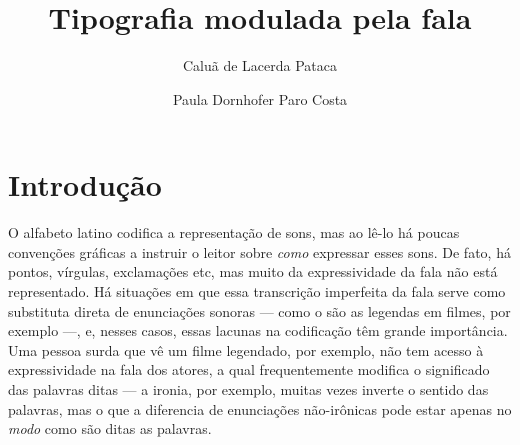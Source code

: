 \documentclass[11pt]{article}
\title{Tipografia modulada pela fala}
\author{Caluã de Lacerda Pataca \and Paula Dornhofer Paro Costa}
\begin{document}
\hyphenation{}
\pagestyle{fancy}


  \section{Introdu\c{c}\~{a}o}
  \label{sec:introducao}

  O alfabeto latino codifica a representação de sons, mas ao lê-lo há poucas convenções gráficas a instruir o leitor sobre {\itshape como} expressar esses sons. De fato, há pontos, vírgulas, exclamações etc, mas muito da expressividade da fala não está representado. Há situações em que essa transcrição imperfeita da fala serve como substituta direta de enunciações sonoras --- como o são as legendas em filmes, por exemplo ---, e, nesses casos, essas lacunas na codificação têm grande importância. Uma pessoa surda que vê um filme legendado, por exemplo, não tem acesso à expressividade na fala dos atores, a qual frequentemente modifica o significado das palavras ditas --- a ironia, por exemplo, muitas vezes inverte o sentido das palavras, mas o que a diferencia de enunciações não-irônicas pode estar apenas no {\itshape modo} como são ditas as palavras.
  
\end{document}
